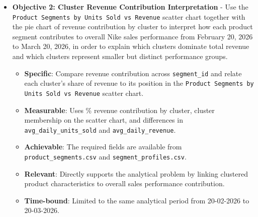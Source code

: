     \begin{itemize}
        \item \textbf{Objective 2: Cluster Revenue Contribution Interpretation} - Use the \texttt{Product Segments by Units Sold vs Revenue} scatter chart together with the pie chart of revenue contribution by cluster to interpret how each product segment contributes to overall Nike sales performance from February 20, 2026 to March 20, 2026, in order to explain which clusters dominate total revenue and which clusters represent smaller but distinct performance groups.
        \begin{itemize}
            \item \textbf{Specific}: Compare revenue contribution across \texttt{segment\_id} and relate each cluster's share of revenue to its position in the \texttt{Product Segments by Units Sold vs Revenue} scatter chart.
            \item \textbf{Measurable}: Uses \% revenue contribution by cluster, cluster membership on the scatter chart, and differences in \texttt{avg\_daily\_units\_sold} and \texttt{avg\_daily\_revenue}.
            \item \textbf{Achievable}: The required fields are available from \texttt{product\_segments.csv} and \texttt{segment\_profiles.csv}.
            \item \textbf{Relevant}: Directly supports the analytical problem by linking clustered product characteristics to overall sales performance contribution.
            \item \textbf{Time-bound}: Limited to the same analytical period from 20-02-2026 to 20-03-2026.
        \end{itemize}
    \end{itemize}
